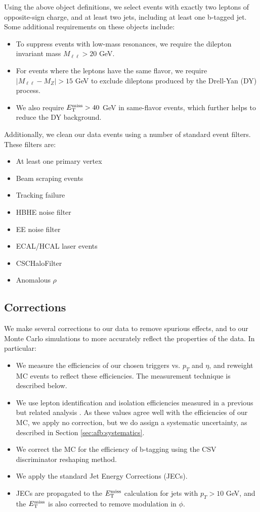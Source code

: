 Using the above object definitions, we select events with exactly
two leptons of opposite-sign charge, and at least two jets, including at
least one b-tagged jet. Some additional requirements on these objects
include:

\begin{itemize}
\item To suppress events with low-mass resonances, we require the
  dilepton invariant mass $M_{\ell\ell} > 20$ GeV.
\item For events where the leptons have the same flavor, we require
  $|M_{\ell\ell} - M_Z| > 15$ GeV to exclude dileptons produced by the
  Drell-Yan (DY) process.
\item We also require $E_\text{T}^\text{miss} > 40$ GeV in same-flavor events, which
  further helps to reduce the DY background.
\end{itemize}

Additionally, we clean our data events using a number of standard
event filters. These filters are:

\begin{itemize}
\item At least one primary vertex
\item Beam scraping events
\item Tracking failure
\item HBHE noise filter
\item EE noise filter
\item ECAL/HCAL laser events
\item CSCHaloFilter
\item Anomalous $\rho$
\end{itemize}

\subsection{Corrections}
\label{ssec:afb:evtweights}

We make several corrections to our data to remove spurious effects,
and to our Monte Carlo simulations to more accurately reflect the
properties of the data. In particular:

\begin{itemize}
\item We measure the efficiencies of our chosen triggers
  vs. $p_T$ and $\eta$, and reweight
  MC events to reflect these efficiencies. The measurement technique
  is described below.
\item We use lepton identification and isolation efficiencies measured
  in a previous but related analysis \cite{run1stop1l}. As these values agree well with
  the efficiencies of our MC, we apply no correction, but we do assign
  a systematic uncertainty, as described in Section
  \ref{sec:afb:systematics}.
\item We correct the MC for the efficiency of b-tagging using the CSV
  discriminator reshaping method.
\item We apply the standard Jet Energy Corrections (JECs).
\item JECs are propagated to the $E_\text{T}^\text{miss}$ calculation for jets with $p_T >
  10$ GeV, and the $E_\text{T}^\text{miss}$ is also corrected to remove modulation in $\phi$.
\end{itemize}

